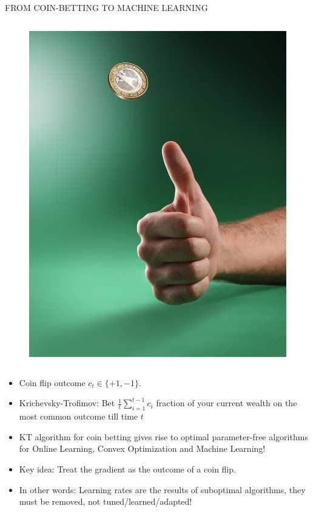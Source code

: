 \documentclass[final,t,serif,mathserif]{beamer}
\begin{document}
\begin{frame}{}
\begin{columns}[t]
\begin{column}{.33\linewidth}
\begin{block}{FROM COIN-BETTING TO MACHINE LEARNING}
\begin{columns}[c]
\begin{column}{7cm}
\begin{figure}
			\includegraphics[width=\linewidth]{figs/coin_toss}
		\end{figure}
	\end{column}
    \end{columns}

    \vspace{1cm}

    \begin{itemize}
      \item Coin flip outcome $c_t \in \{+1, -1\}$.
      \item Krichevsky-Trofimov: Bet $\tfrac{1}{t} \sum_{i=1}^{t-1} c_i$ fraction of your current wealth on the most common outcome till time $t$
      \item \alert{KT algorithm for coin betting gives rise to optimal parameter-free algorithms for Online Learning, Convex Optimization and Machine Learning!}
      \item Key idea: Treat the gradient as the outcome of a coin flip.
      \item In other words: \alert{Learning rates are the results of suboptimal algorithms, they must be removed, not tuned/learned/adapted!}
    \end{itemize}
    

\end{block}
\end{column}
\end{columns}
\end{frame}
\end{document}
